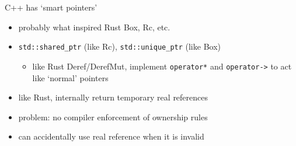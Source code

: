 \begin{frame}{C++ has `smart pointers'}
    \begin{itemize}
    \item probably what inspired Rust Box, Rc, etc.
    \vspace{.5cm}
    \item \texttt{std::shared\_ptr} (like Rc), \texttt{std::unique\_ptr} (like Box)
        \begin{itemize}
        \item like Rust Deref/DerefMut, implement \texttt{operator*} and \texttt{operator->} to act
            like `normal' pointers
        \end{itemize}
    \item like Rust, internally return temporary real references
    \vspace{.5cm}
    \item problem: no compiler enforcement of ownership rules
    \item can accidentally use real reference when it is invalid
    \end{itemize}
\end{frame}
